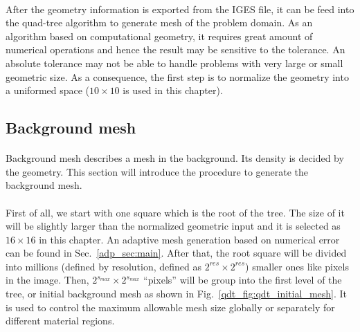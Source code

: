 \paragraph{}
After the geometry information is exported from the IGES file, it can be feed into the quad-tree algorithm to generate mesh of the problem domain.
As an algorithm based on computational geometry, it requires great amount of numerical operations and hence the result may be sensitive to the tolerance.
An absolute tolerance may not be able to handle problems with very large or small geometric size.
As a consequence, the first step is to normalize the geometry into a uniformed space ($10\times10$ is used in this chapter).

\subsection{Background mesh}
\label{qdt_sc:qdt_background_mesh}
\paragraph{}
Background mesh describes a mesh in the background. %
Its density is decided by the geometry.
This section will introduce the procedure to generate the background mesh.
\paragraph{}
First of all, we start with one square which is the root of the tree.
The size of it will be slightly larger than the normalized geometric input and it is selected as $16 \times 16$ in this chapter.
An adaptive mesh generation based on numerical error can be found in Sec.~\ref{adp_sec:main}.
After that, the root square will be divided into millions (defined by resolution, defined as $2^{res} \times 2^{res}$) smaller ones like pixels in the image.
Then, $2^{s_{max}} \times 2^{s_{max}}$ ``pixels'' will be group into the first level of the tree, or initial background mesh as shown in Fig.~\ref{qdt_fig:qdt_initial_mesh}.
It is used to control the maximum allowable mesh size globally or separately for different material regions.

